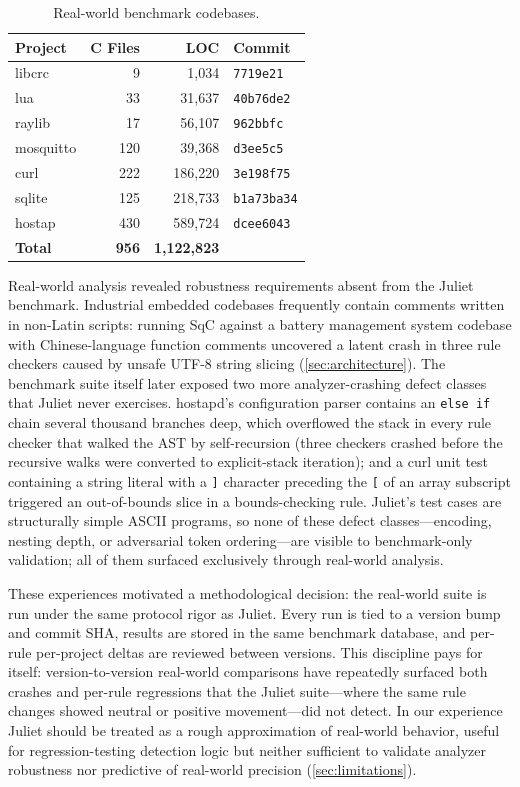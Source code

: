 \begin{table}[t]
\centering
\footnotesize
\begin{tabular}{@{}lrrl@{}}
\toprule
\textbf{Project} & \textbf{C Files} & \textbf{LOC} & \textbf{Commit} \\
\midrule
libcrc & 9 & 1,034 & \texttt{7719e21} \\
lua & 33 & 31,637 & \texttt{40b76de2} \\
raylib & 17 & 56,107 & \texttt{962bbfc} \\
mosquitto & 120 & 39,368 & \texttt{d3ee5c5} \\
curl & 222 & 186,220 & \texttt{3e198f75} \\
sqlite & 125 & 218,733 & \texttt{b1a73ba34} \\
hostap & 430 & 589,724 & \texttt{dcee6043} \\
\midrule
\textbf{Total} & \textbf{956} & \textbf{1,122,823} & \\
\bottomrule
\end{tabular}
\caption{Real-world benchmark codebases.}
\label{tab:realworld-codebases}
\end{table}

Real-world analysis revealed robustness requirements absent from the
Juliet benchmark.  Industrial embedded codebases frequently contain
comments written in non-Latin scripts: running SqC against a battery
management system codebase with Chinese-language function comments
uncovered a latent crash in three rule checkers caused by unsafe
UTF-8 string slicing (\cref{sec:architecture}).  The benchmark suite
itself later exposed two more analyzer-crashing defect classes that
Juliet never exercises.  hostapd's configuration parser contains an
\texttt{else if} chain several thousand branches deep, which overflowed
the stack in every rule checker that walked the AST by self-recursion
(three checkers crashed before the recursive walks were converted to
explicit-stack iteration); and a curl unit test containing a string
literal with a \texttt{]} character preceding the \texttt{[} of an
array subscript triggered an out-of-bounds slice in a bounds-checking
rule.  Juliet's test cases are structurally simple ASCII programs, so
none of these defect classes---encoding, nesting depth, or adversarial
token ordering---are visible to benchmark-only validation; all of them
surfaced exclusively through real-world analysis.

These experiences motivated a methodological decision: the real-world
suite is run under the same protocol rigor as Juliet.  Every run is
tied to a version bump and commit SHA, results are stored in the same
benchmark database, and per-rule per-project deltas are reviewed
between versions.  This discipline pays for itself: version-to-version
real-world comparisons have repeatedly surfaced both crashes and
per-rule regressions that the Juliet suite---where the same rule
changes showed neutral or positive movement---did not detect.  In our
experience Juliet should be treated as a rough approximation of
real-world behavior, useful for regression-testing detection logic but
neither sufficient to validate analyzer robustness nor predictive of
real-world precision (\cref{sec:limitations}).

